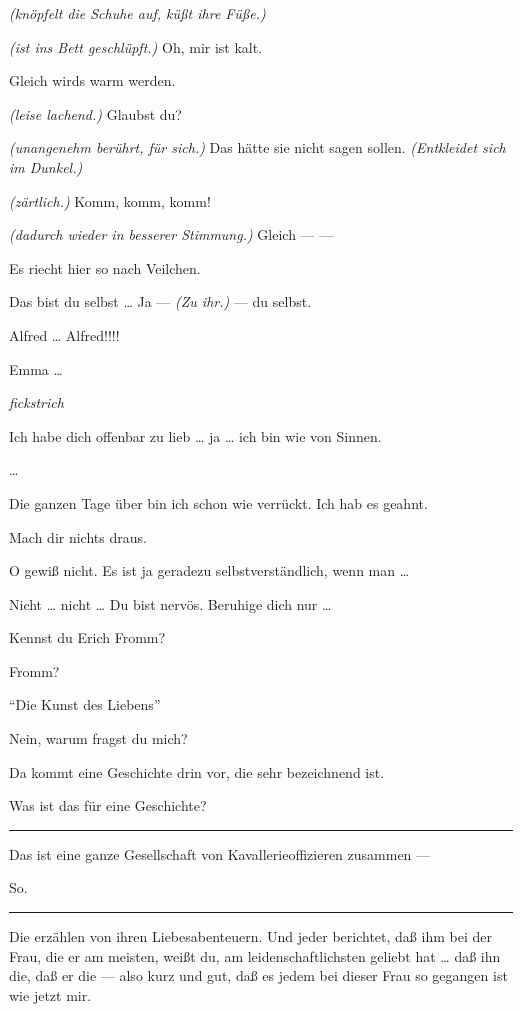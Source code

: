 \documentclass[
	final,
	a4paper,
	ngerman,
	mpinclude = true, %
	twoside = true,
	open = right,
	cleardoublepage = plain,
	DIV = 13,
	BCOR = 1cm,
	titlepage = firstiscover,
	]{scrbook}
\newcommand{\marginnote}[1]{\marginpar{\singlespacing\raggedright\footnotesize#1}}
\newcommand{\direction}[1]{\textit{(#1)}}
\newcommand{\hiat}{%
	\begin{center}
		\tiny
		\raisebox{0.5ex}{\rule{0.3\linewidth}{0.4pt}}
		\textit{fickstrich}
		\raisebox{0.5ex}{\rule{0.3\linewidth}{0.4pt}}
	\end{center}
}
\newenvironment{deletion}{%
		\vspace{0.25\baselineskip}
		\hrule
		\vspace{0.25\baselineskip}
		\color{darkgray}
	}{
		\color{black}
		\vspace{0.25\baselineskip}
		\hrule 
		\vspace{0.25\baselineskip}
	}
\newcommand{\thecharacter}[1]{\textup{\textsc{#1}}\xspace}
\newcommand{\theherr}{\thecharacter{Junger Herr}}
\newcommand{\thefrau}{\thecharacter{Junge Frau}}
\newcommand{\character}[1]{\item[#1:]}
\newcommand{\herr}{\character{\theherr}}
\newcommand{\frau}{\character{\thefrau}}
\begin{document}
\begin{play}
	\herr
	\direction{knöpfelt die Schuhe auf, küßt ihre Füße.}

	\frau
	\direction{ist ins Bett geschlüpft.} Oh, mir ist kalt.

	\herr
	Gleich wirds warm werden.

	\frau
	\direction{leise lachend.} Glaubst du?

	\herr
	\direction{unangenehm berührt, für sich.} Das hätte sie nicht sagen sollen. \direction{Entkleidet sich im Dunkel.}

	\frau
	\direction{zärtlich.} Komm, komm, komm!

	\herr
	\direction{dadurch wieder in besserer Stimmung.} Gleich --- ---

	\frau
	Es riecht hier so nach Veilchen.

	\herr
	Das bist du selbst \ldots{} Ja --- \direction{Zu ihr.} --- du selbst.

	\frau
	Alfred \ldots{} Alfred!!!!

	\herr
	Emma \ldots{}

	\marginnote{Er bekommt keinen hoch.}
	\hiat

	\herr
	Ich habe dich offenbar zu lieb \ldots{} ja \ldots{} ich bin wie von Sinnen.

	\frau
	\ldots{}

	\herr
	Die ganzen Tage über bin ich schon wie verrückt. Ich hab es geahnt.

	\frau
	Mach dir nichts draus.

	\herr
	O gewiß nicht. Es ist ja geradezu selbstverständlich, wenn man \ldots{}

	\frau
	Nicht \ldots{} nicht \ldots{} Du bist nervös. Beruhige dich nur \ldots{}

	\herr
	Kennst du Erich Fromm?

	\frau
	Fromm?

	\herr
	\enquote{Die Kunst des Liebens}

	\frau
	Nein, warum fragst du mich?

	\herr
	Da kommt eine Geschichte drin vor, die sehr bezeichnend ist.

	\frau
	Was ist das für eine Geschichte?

	\begin{deletion}
	\herr
	Das ist eine ganze Gesellschaft von Kavallerieoffizieren zusammen ---

	\frau
	So.
	\end{deletion}

	\herr
	Die erzählen von ihren Liebesabenteuern. Und jeder berichtet, daß ihm bei der Frau, die er am meisten, weißt du, am leidenschaftlichsten geliebt hat \ldots{} daß ihn die, daß er die --- also kurz und gut, daß es jedem bei dieser Frau so gegangen ist wie jetzt mir.


\end{play}
\end{document}
